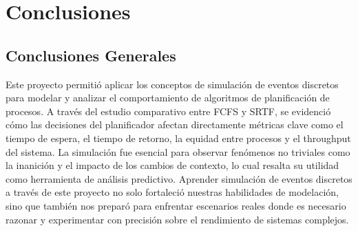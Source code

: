 \documentclass[12pt]{article}
\begin{document}
	\section{Conclusiones}
	
	\subsection{Conclusiones Generales}
	Este proyecto permitió aplicar los conceptos de simulación de eventos discretos para modelar y analizar el comportamiento de algoritmos de planificación de procesos. A través del estudio comparativo entre FCFS y SRTF, se evidenció cómo las decisiones del planificador afectan directamente métricas clave como el tiempo de espera, el tiempo de retorno, la equidad entre procesos y el throughput del sistema. La simulación fue esencial para observar fenómenos no triviales como la inanición y el impacto de los cambios de contexto, lo cual resalta su utilidad como herramienta de análisis predictivo. Aprender simulación de eventos discretos a través de este proyecto no solo fortaleció nuestras habilidades de modelación, sino que también nos preparó para enfrentar escenarios reales donde es necesario razonar y experimentar con precisión sobre el rendimiento de sistemas complejos.
	
	
\end{document}

